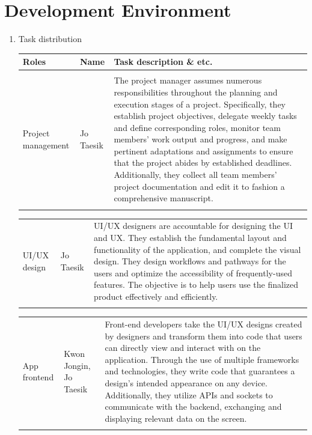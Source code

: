 \documentclass[11pt, conference]{IEEEtran}
\begin{document}
\section{\Large{Development Environment}}
\begin{enumerate}[label=\arabic*]
    \item {\large{Task distribution}}
    \begin{table}[H]
    \center
    \begin{tabular}{m{1.4cm} m{1.5cm} m{4cm}}
    \toprule
    Roles & Name & Task description \& etc.\\
    \midrule
    \\
    Project management & Jo Taesik & The project manager assumes numerous responsibilities throughout the planning and execution stages of a project. Specifically, they establish project objectives, delegate weekly tasks and define corresponding roles, monitor team members' work output and progress, and make pertinent adaptations and assignments to ensure that the project abides by established deadlines. Additionally, they collect all team members' project documentation and edit it to fashion a comprehensive manuscript. \\\\
    \bottomrule
    \end{tabular}
    \end{table}
    
    \begin{table}[H]
    \center
    \begin{tabular}{m{1.4cm} m{1.5cm} m{4cm}}
    UI/UX design & Jo Taesik & UI/UX designers are accountable for designing the UI and UX. They establish the fundamental layout and functionality of the application, and complete the visual design. They design workflows and pathways for the users and optimize the accessibility of frequently-used features. The objective is to help users use the finalized product effectively and efficiently. \\\\
    \bottomrule
    \end{tabular}
    \end{table}

    \begin{table}[H]
    \center
    \begin{tabular}{m{1.4cm} m{1.5cm} m{4cm}}
    App frontend & Kwon Jongin, Jo Taesik & Front-end developers take the UI/UX designs created by designers and transform them into code that users can directly view and interact with on the application. Through the use of multiple frameworks and technologies, they write code that guarantees a design’s intended appearance on any device. Additionally, they utilize APIs and sockets to communicate with the backend, exchanging and displaying relevant data on the screen. \\\\
    \bottomrule
    \end{tabular}
    \end{table}


\end{enumerate}
\end{document}
